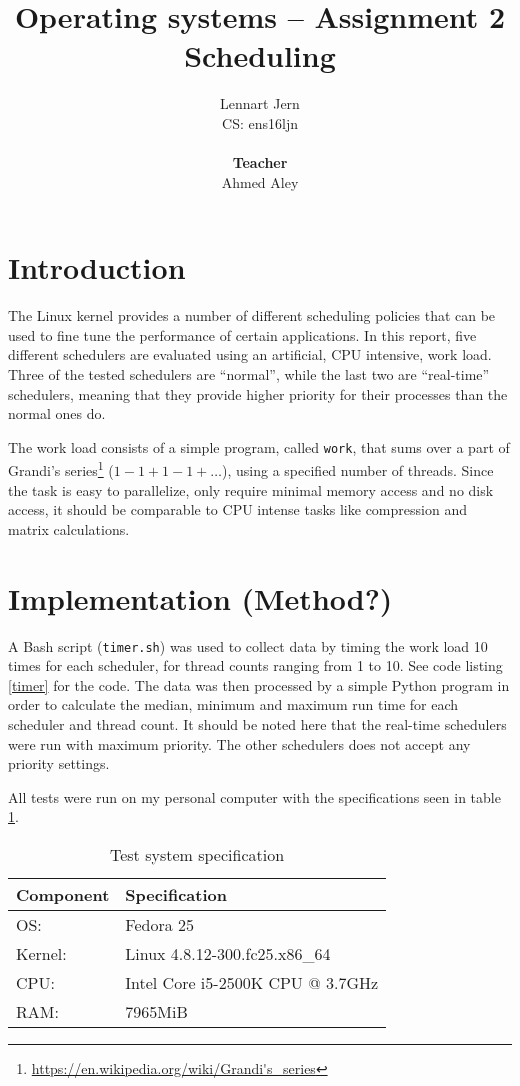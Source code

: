 \documentclass[12pt, a4paper]{article} %
\title{Operating systems -- Assignment 2\\Scheduling}
\author{Lennart Jern\\
	CS: ens16ljn\\ \\ \textbf{Teacher}\\ Ahmed Aley}
\begin{document}
\maketitle

\newpage


\section{Introduction}

The Linux kernel provides a number of different scheduling policies that can be used to fine tune the performance of certain applications.
In this report, five different schedulers are evaluated using an artificial, CPU intensive, work load.
Three of the tested schedulers are ``normal'', while the last two are ``real-time'' schedulers, meaning that they provide higher priority for their processes than the normal ones do.

The work load consists of a simple program, called \texttt{work}, that sums over a part of Grandi's series\footnote{\url{https://en.wikipedia.org/wiki/Grandi's_series}} ($1-1+1-1+\dots$), using a specified number of threads.
Since the task is easy to parallelize, only require minimal memory access and no disk access, it should be comparable to CPU intense tasks like compression and matrix calculations.

\section{Implementation (Method?)}

A Bash script (\texttt{timer.sh}) was used to collect data by timing the work load 10 times for each scheduler, for thread counts ranging from 1 to 10.
See code listing \ref{timer} for the code.
The data was then processed by a simple Python program in order to calculate the median, minimum and maximum run time for each scheduler and thread count.
It should be noted here that the real-time schedulers were run with maximum priority.
The other schedulers does not accept any priority settings.

All tests were run on my personal computer with the specifications seen in table \ref{spec}.


\begin{table}[h]
	\centering
	\begin{tabular}{ll}
		Component & Specification \\
		\hline
		OS: & Fedora 25 \\
		Kernel: & Linux 4.8.12-300.fc25.x86\_64 \\
		CPU: & Intel Core i5-2500K CPU @ 3.7GHz \\
		RAM: & 7965MiB
	\end{tabular}
	\caption{Test system specification}
	\label{spec}
\end{table}
\end{document}
